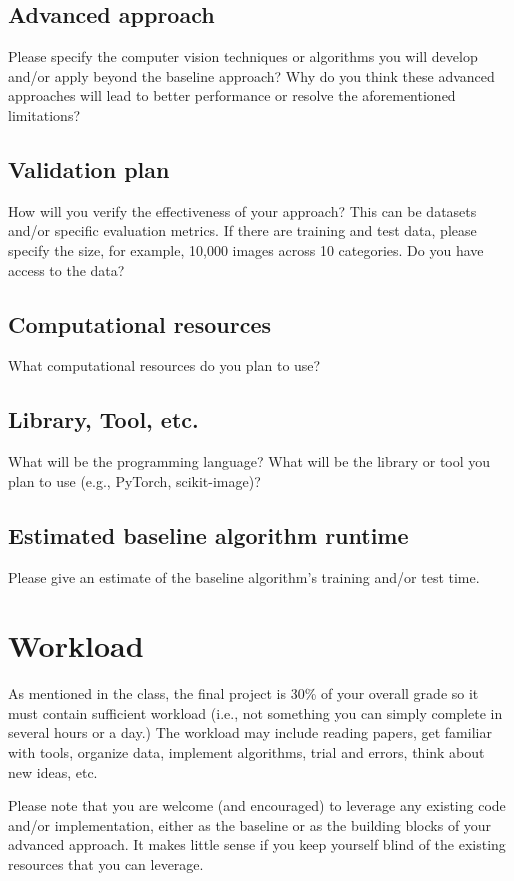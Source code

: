 \documentclass{article}
\begin{document}
\subsection{Advanced approach}
{\color{red}
Please specify the computer vision techniques or algorithms you will develop and/or apply beyond the baseline approach? Why do you think these advanced approaches will lead to better performance or resolve the aforementioned limitations?
} 

\subsection{Validation plan}
{\color{red}
How will you verify the effectiveness of your approach? This can be datasets and/or specific evaluation metrics. If there are training and test data, please specify the size, for example, 10,000 images across 10 categories. Do you have access to the data?
}

\subsection{Computational resources}
{\color{red}
What computational resources do you plan to use?
}

\subsection{Library, Tool, etc.}
{\color{red}
What will be the programming language? What will be the library or tool you plan to use (e.g., PyTorch, scikit-image)?
}

\subsection{Estimated baseline algorithm runtime}
{\color{red}
Please give an estimate of the baseline algorithm's training and/or test time.
}

\section{Workload}
{\color{red}
As mentioned in the class, the final project is 30\% of your overall grade so it must contain sufficient workload (i.e., not something you can simply complete in several hours or a day.) The workload may include reading papers, get familiar with tools, organize data, implement algorithms, trial and errors, think about new ideas, etc.

Please note that you are welcome (and encouraged) to leverage any existing code and/or implementation, either as the baseline or as the building blocks of your advanced approach. It makes little sense if you keep yourself blind of the existing resources that you can leverage. 
}
\end{document}
